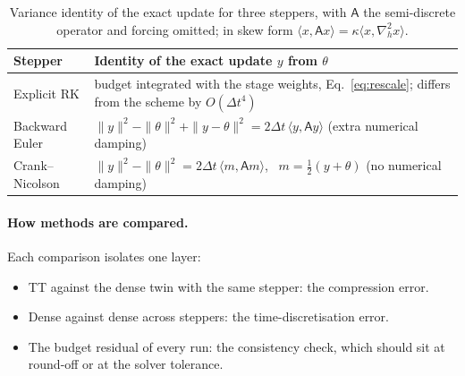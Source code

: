 \documentclass[aps,prfluids,reprint,onecolumn,amsmath,amssymb,nofootinbib,floatfix]{revtex4-2}
\begin{document}
\begin{table}[h]
\caption{Variance identity of the exact update for three steppers, with
$\mathsf{A}$ the semi-discrete operator and forcing omitted; in skew form
$\langle x,\mathsf{A}x\rangle=\kappa\langle x,\nabla_h^2x\rangle$.}
\label{tab:identities}
\begin{ruledtabular}
\begin{tabular}{ll}
Stepper & Identity of the exact update $y$ from $\theta$\\
\hline
Explicit RK & budget integrated with the stage weights, Eq.~\eqref{eq:rescale}; differs from the scheme by $O(\Delta t^4)$\\
Backward Euler & $\|y\|^2-\|\theta\|^2+\|y-\theta\|^2 = 2\Delta t\,\langle y,\mathsf{A}y\rangle$ \quad (extra numerical damping)\\
Crank--Nicolson & $\|y\|^2-\|\theta\|^2 = 2\Delta t\,\langle m,\mathsf{A}m\rangle$, \ $m=\tfrac12(y+\theta)$ \quad (no numerical damping)\\
\end{tabular}
\end{ruledtabular}
\end{table}

\paragraph{How methods are compared.} Each comparison isolates one layer:
\begin{itemize}
\item TT against the dense twin with the same stepper: the compression error.
\item Dense against dense across steppers: the time-discretisation error.
\item The budget residual of every run: the consistency check, which should sit
      at round-off or at the solver tolerance.
\end{itemize}
\end{document}
